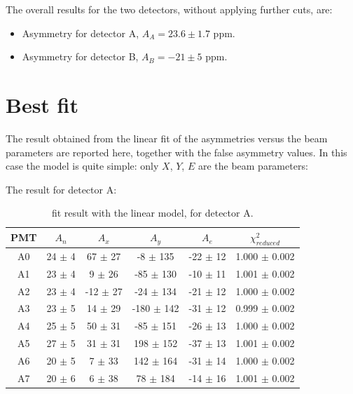 The overall results for the two detectors, without applying further cuts, are: 
\begin{itemize}
\item Asymmetry for detector A, $A_{A} =  23.6 \pm 1.7$ ppm.
\item Asymmetry for detector B, $A_{B} = -21 \pm 5$ ppm.
\end{itemize}

\newpage
\section{Best fit}
The result obtained from the linear fit of the asymmetries versus the beam parameters are reported here, together with the false asymmetry values. In this case the model is quite simple: only $X$, $Y$, $E$ are the beam parameters:

The result for detector A:
\begin{table}[h] 
\centering
\begin{tabular}{c|c|c|c|c|c}
\hline
 PMT   & $A_{n}$    & $A_{x}$          & $A_{y}$            & $A_{e}$         & $\chi^{2}_{reduced}$ \\
\hline
 A0    & 24 $\pm$ 4 & 67 $\pm$ 27  & -8 $\pm$ 135   & -22 $\pm$ 12 & 1.000 $\pm$ 0.002   \\
 A1    & 23 $\pm$ 4 & 9 $\pm$ 26   & -85 $\pm$ 130  & -10 $\pm$ 11 & 1.001 $\pm$ 0.002 \\
 A2    & 23 $\pm$ 4 & -12 $\pm$ 27 & -24 $\pm$ 134  & -21 $\pm$ 12 & 1.000 $\pm$ 0.002   \\
 A3    & 23 $\pm$ 5 & 14 $\pm$ 29  & -180 $\pm$ 142 & -31 $\pm$ 12 & 0.999 $\pm$ 0.002 \\
 A4    & 25 $\pm$ 5 & 50 $\pm$ 31  & -85 $\pm$ 151  & -26 $\pm$ 13 & 1.000 $\pm$ 0.002   \\
 A5    & 27 $\pm$ 5 & 31 $\pm$ 31  & 198 $\pm$ 152  & -37 $\pm$ 13 & 1.001 $\pm$ 0.002 \\
 A6    & 20 $\pm$ 5 & 7 $\pm$ 33   & 142 $\pm$ 164  & -31 $\pm$ 14 & 1.000 $\pm$ 0.002   \\
 A7    & 20 $\pm$ 6 & 6 $\pm$ 38   & 78 $\pm$ 184   & -14 $\pm$ 16 & 1.001 $\pm$ 0.002 \\
\hline
\end{tabular}
\caption{fit result with the linear model, for detector A.}
\label{tb:resultA}
\end{table}

